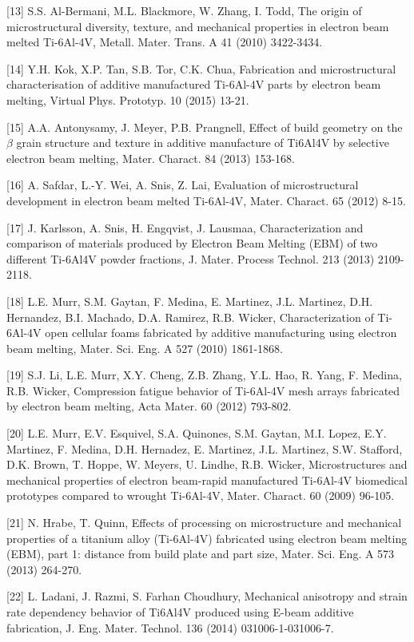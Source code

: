 \documentclass[10pt]{article}
\begin{document}
[13] S.S. Al-Bermani, M.L. Blackmore, W. Zhang, I. Todd, The origin of microstructural diversity, texture, and mechanical properties in electron beam melted Ti-6Al-4V, Metall. Mater. Trans. A 41 (2010) 3422-3434.

[14] Y.H. Kok, X.P. Tan, S.B. Tor, C.K. Chua, Fabrication and microstructural characterisation of additive manufactured Ti-6Al-4V parts by electron beam melting, Virtual Phys. Prototyp. 10 (2015) 13-21.

[15] A.A. Antonysamy, J. Meyer, P.B. Prangnell, Effect of build geometry on the $\beta$ grain structure and texture in additive manufacture of Ti6Al4V by selective electron beam melting, Mater. Charact. 84 (2013) 153-168.

[16] A. Safdar, L.-Y. Wei, A. Snis, Z. Lai, Evaluation of microstructural development in electron beam melted Ti-6Al-4V, Mater. Charact. 65 (2012) 8-15.

[17] J. Karlsson, A. Snis, H. Engqvist, J. Lausmaa, Characterization and comparison of materials produced by Electron Beam Melting (EBM) of two different Ti-6Al4V powder fractions, J. Mater. Process Technol. 213 (2013) 2109-2118.

[18] L.E. Murr, S.M. Gaytan, F. Medina, E. Martinez, J.L. Martinez, D.H. Hernandez, B.I. Machado, D.A. Ramirez, R.B. Wicker, Characterization of Ti-6Al-4V open cellular foams fabricated by additive manufacturing using electron beam melting, Mater. Sci. Eng. A 527 (2010) 1861-1868.

[19] S.J. Li, L.E. Murr, X.Y. Cheng, Z.B. Zhang, Y.L. Hao, R. Yang, F. Medina, R.B. Wicker, Compression fatigue behavior of Ti-6Al-4V mesh arrays fabricated by electron beam melting, Acta Mater. 60 (2012) 793-802.

[20] L.E. Murr, E.V. Esquivel, S.A. Quinones, S.M. Gaytan, M.I. Lopez, E.Y. Martinez, F. Medina, D.H. Hernadez, E. Martinez, J.L. Martinez, S.W. Stafford, D.K. Brown, T. Hoppe, W. Meyers, U. Lindhe, R.B. Wicker, Microstructures and mechanical properties of electron beam-rapid manufactured Ti-6Al-4V biomedical prototypes compared to wrought Ti-6Al-4V, Mater. Charact. 60 (2009) 96-105.

[21] N. Hrabe, T. Quinn, Effects of processing on microstructure and mechanical properties of a titanium alloy (Ti-6Al-4V) fabricated using electron beam melting (EBM), part 1: distance from build plate and part size, Mater. Sci. Eng. A 573 (2013) 264-270.

[22] L. Ladani, J. Razmi, S. Farhan Choudhury, Mechanical anisotropy and strain rate dependency behavior of Ti6Al4V produced using E-beam additive fabrication, J. Eng. Mater. Technol. 136 (2014) 031006-1-031006-7.
\end{document}
